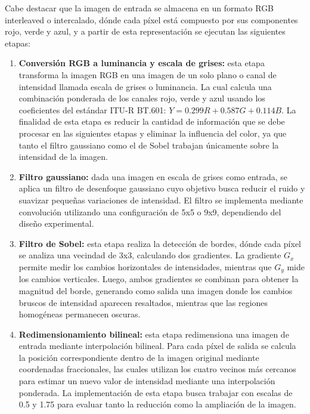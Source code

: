 \documentclass[12pt,a4paper]{article}
\begin{document}
Cabe destacar que la imagen de entrada se almacena en un formato RGB interleaved o intercalado, dónde cada píxel está compuesto por sus componentes rojo, verde y azul, y a partir de esta representación se ejecutan las siguientes etapas:

\begin{enumerate}
  \item \textbf{Conversión RGB a luminancia y escala de grises:} esta etapa transforma la imagen RGB en una imagen de un solo plano o canal de intensidad llamada escala de grises o luminancia. La cual calcula una combinación ponderada de los canales rojo, verde y azul usando los coeficientes del estándar ITU-R BT.601: $Y = 0.299R + 0.587G + 0.114B$. La finalidad de esta etapa es reducir la cantidad de información que se debe procesar en las siguientes etapas y eliminar la influencia del color, ya que tanto el filtro gaussiano como el de Sobel trabajan únicamente sobre la intensidad de la imagen.
  \item \textbf{Filtro gaussiano:} dada una imagen en escala de grises como entrada, se aplica un filtro de desenfoque gaussiano cuyo objetivo busca reducir el ruido y suavizar pequeñas variaciones de intensidad. El filtro se implementa mediante convolución utilizando una configuración de 5x5 o 9x9, dependiendo del diseño experimental.
  \item \textbf{Filtro de Sobel:} esta etapa realiza la detección de bordes, dónde cada píxel se analiza una vecindad de 3x3, calculando dos gradientes. La gradiente $G_{x}$ permite medir los cambios horizontales de intensidades, mientras que $G_{y}$ mide los cambios verticales. Luego, ambos gradientes se combinan para obtener la magnitud del borde, generando como salida una imagen donde los cambios bruscos de intensidad aparecen resaltados, mientras que las regiones homogéneas permanecen oscuras.
  \item \textbf{Redimensionamiento bilineal:} esta etapa redimensiona una imagen de entrada mediante interpolación bilineal. Para cada píxel de salida se calcula la posición correspondiente dentro de la imagen original mediante coordenadas fraccionales, las cuales utilizan los cuatro vecinos más cercanos para estimar un nuevo valor de intensidad mediante una interpolación ponderada. La implementación de esta etapa busca trabajar con escalas de 0.5 y 1.75 para evaluar tanto la reducción como la ampliación de la imagen.
\end{enumerate}
\end{document}
